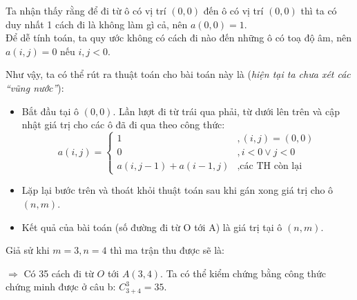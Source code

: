 \documentclass[12pt]{article}
\newcommand{\Ra}{\ensuremath{\Rightarrow} }
\begin{document}
\par Ta nhận thấy rằng để đi từ ô có vị trí $(0, 0)$ đến ô có vị trí $(0, 0)$ thì ta có duy nhất 1 cách đi là không làm gì cả, nên $a(0,0) = 1$. \\ Để dễ tính toán, ta quy ước không có cách đi nào đến những ô có toạ độ âm, nên $a(i, j) = 0$ nếu $i, j < 0$. 

Như vậy, ta có thể rút ra thuật toán cho bài toán này là (\textit{hiện tại ta chưa xét các ``vũng nước''}):
\begin{itemize}
    \item Bắt đầu tại ô $(0, 0)$. Lần lượt đi từ trái qua phải, từ dưới lên trên và cập nhật giá trị cho các ô đã đi qua theo công thức:
    $$
    a(i,j) = \begin{cases}
        1 &, (i, j) = (0, 0) \\
        0 &, i < 0 \vee j < 0 \\
        a(i, j-1) + a(i-1,j) &, \text{các TH còn lại}    
    \end{cases}
    $$
    \item Lặp lại bước trên và thoát khỏi thuật toán sau khi gán xong giá trị cho ô $(n, m)$.
    \item Kết quả của bài toán (số đường đi từ O tới A) là giá trị tại ô $(n,m)$.
\end{itemize}

Giả sử khi $m=3, n=4$ thì ma trận thu được sẽ là:
\begin{figure}[H]
    \centering
\end{figure}
$\Ra$ Có 35 cách đi từ $O$ tới $A(3,4)$. Ta có thể kiểm chứng bằng công thức chứng minh được ở câu b: $C_{3+4}^{3} = 35$.
\end{document}

